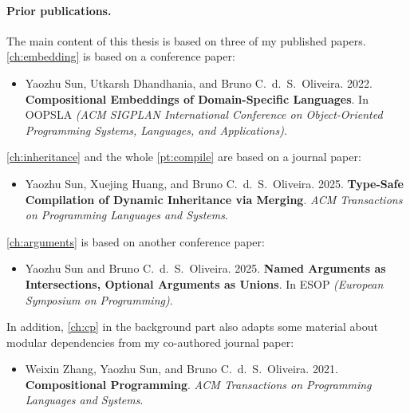 \paragraph{Prior publications.}
The main content of this thesis is based on three of my published papers.
\autoref{ch:embedding} is based on a conference paper:
\begin{itemize}
\item Yaozhu Sun, Utkarsh Dhandhania, and Bruno C.~d.~S.~Oliveira. 2022.
\textbf{Compositional Embeddings of Domain-Specific Languages}. In OOPSLA
\textit{(ACM SIGPLAN International Conference on Object-Oriented Programming
Systems, Languages, and Applications)}.
\end{itemize}
\autoref{ch:inheritance} and the whole \autoref{pt:compile} are based on a
journal paper:
\begin{itemize}
\item Yaozhu Sun, Xuejing Huang, and Bruno C.~d.~S.~Oliveira. 2025.
\textbf{Type-Safe Compilation of Dynamic Inheritance via Merging}.
\textit{ACM Transactions on Programming Languages and Systems}.
\end{itemize}
\autoref{ch:arguments} is based on another conference paper:
\begin{itemize}
\item Yaozhu Sun and Bruno C.~d.~S.~Oliveira. 2025.
\textbf{Named Arguments as Intersections, Optional Arguments as Unions}.
In ESOP \textit{(European Symposium on Programming)}.
\end{itemize}
In addition, \autoref{ch:cp} in the background part also adapts some material
about modular dependencies from my co-authored journal paper:
\begin{itemize}
\item Weixin Zhang, Yaozhu Sun, and Bruno C.~d.~S.~Oliveira. 2021.
\textbf{Compositional Programming}. \textit{ACM Transactions on Programming
Languages and Systems}.
\end{itemize}
